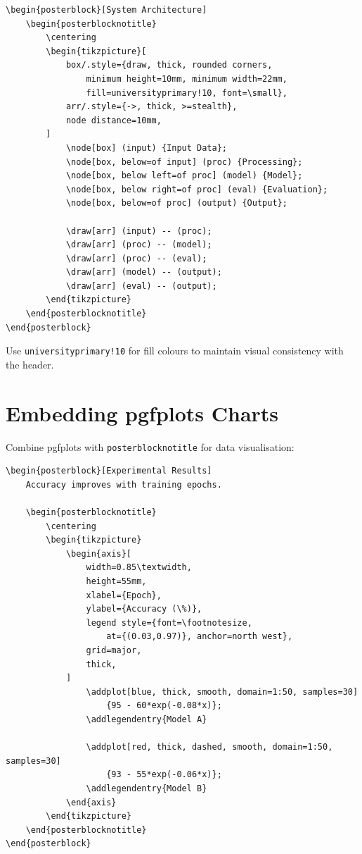 \begin{verbatim}
\begin{posterblock}[System Architecture]
    \begin{posterblocknotitle}
        \centering
        \begin{tikzpicture}[
            box/.style={draw, thick, rounded corners,
                minimum height=10mm, minimum width=22mm,
                fill=universityprimary!10, font=\small},
            arr/.style={->, thick, >=stealth},
            node distance=10mm,
        ]
            \node[box] (input) {Input Data};
            \node[box, below=of input] (proc) {Processing};
            \node[box, below left=of proc] (model) {Model};
            \node[box, below right=of proc] (eval) {Evaluation};
            \node[box, below=of proc] (output) {Output};

            \draw[arr] (input) -- (proc);
            \draw[arr] (proc) -- (model);
            \draw[arr] (proc) -- (eval);
            \draw[arr] (model) -- (output);
            \draw[arr] (eval) -- (output);
        \end{tikzpicture}
    \end{posterblocknotitle}
\end{posterblock}
\end{verbatim}

Use \texttt{universityprimary!10} for fill colours to maintain visual
consistency with the header.

\section{Embedding pgfplots Charts}

Combine pgfplots with \texttt{posterblocknotitle} for data visualisation:

\begin{verbatim}
\begin{posterblock}[Experimental Results]
    Accuracy improves with training epochs.

    \begin{posterblocknotitle}
        \centering
        \begin{tikzpicture}
            \begin{axis}[
                width=0.85\textwidth,
                height=55mm,
                xlabel={Epoch},
                ylabel={Accuracy (\%)},
                legend style={font=\footnotesize,
                    at={(0.03,0.97)}, anchor=north west},
                grid=major,
                thick,
            ]
                \addplot[blue, thick, smooth, domain=1:50, samples=30]
                    {95 - 60*exp(-0.08*x)};
                \addlegendentry{Model A}

                \addplot[red, thick, dashed, smooth, domain=1:50, samples=30]
                    {93 - 55*exp(-0.06*x)};
                \addlegendentry{Model B}
            \end{axis}
        \end{tikzpicture}
    \end{posterblocknotitle}
\end{posterblock}
\end{verbatim}

